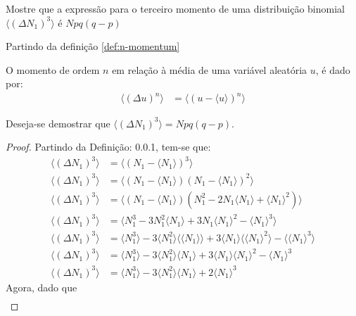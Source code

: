 \begin{prob}
Mostre que a expressão para o terceiro momento de uma distribuição binomial $\langle(\Delta N_1)^3 \rangle$ é $Npq(q-p)$
\begin{sol}
Partindo da definição \ref{def:n-momentum}
\begin{definition}
	\label{def:n-momentum}
	O momento de ordem $n$ em relação à média de uma variável aleatória $u$, é dado por:
	\begin{align}
		\label{eq:n-momentum}
		\langle(\Delta u)^n\rangle & =\langle\left(u-\langle u\rangle\right)^n\rangle
	\end{align}
\end{definition}
\noindent Deseja-se demostrar que $\langle\left(\Delta N_1\right)^3\rangle=Npq(q-p)$.
\begin{proof}
	\noindent Partindo da Definição: 0.0.1, tem-se que:
	\begin{align}
		\label{eq:3-momentum}
		\langle\left(\Delta N_1\right)^3\rangle & =\langle\left(N_1-\langle N_1\rangle\right)^3\rangle\nonumber \\
		\langle\left(\Delta N_1\right)^3\rangle & =\langle\left(N_1-\langle N_1\rangle\right)\left(N_1-\langle N_1\rangle\right)^2\rangle\nonumber \\
		\langle\left(\Delta N_1\right)^3\rangle & =\langle\left(N_1-\langle N_1\rangle\right)\left(N_1^2-2N_1\langle N_1\rangle+\langle N_1\rangle^2\right)\rangle\nonumber \\
		\langle\left(\Delta N_1\right)^3\rangle & =\langle N_1^3-3N_1^2\langle N_1\rangle+3N_1\langle N_1\rangle^2-\langle N_1\rangle^3\rangle\nonumber \\
		\langle\left(\Delta N_1\right)^3\rangle & =\langle N_1^3\rangle-3\langle N_1^2\rangle\langle \langle N_1\rangle\rangle+3\langle N_1\rangle\langle\langle N_1\rangle^2\rangle-\langle\langle N_1\rangle^3\rangle\nonumber \\
		\langle\left(\Delta N_1\right)^3\rangle & =\langle N_1^3\rangle-3\langle N_1^2\rangle\langle N_1\rangle+3\langle N_1\rangle\langle N_1\rangle^2-\langle N_1\rangle^3\nonumber \\
		\langle\left(\Delta N_1\right)^3\rangle & =\langle N_1^3\rangle-3\langle N_1^2\rangle\langle N_1\rangle+2\langle N_1\rangle^3
	\end{align}
	Agora, dado que
	\begin{align}
		\label{eq:N1}

\end{align}
\end{proof}
\end{sol}
\end{prob}
